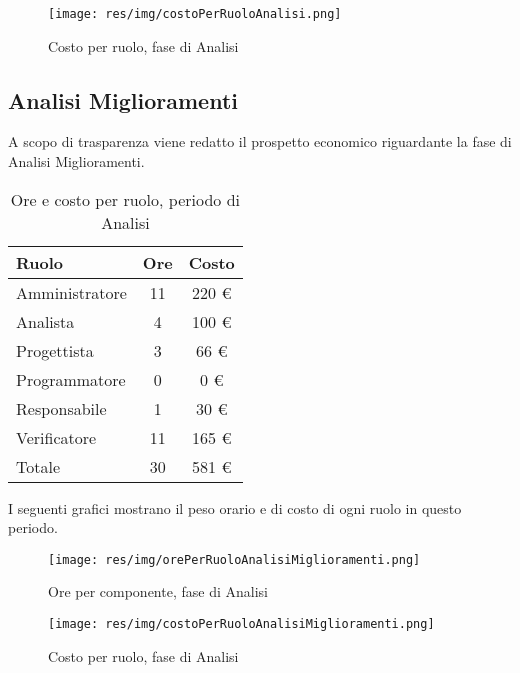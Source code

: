 \begin{figure}[H]
  \begin{center}
    \texttt{[image: res/img/costoPerRuoloAnalisi.png]}
  \caption{Costo per ruolo, fase di Analisi}
  \end{center} 
\end{figure}  


\subsection{Analisi Miglioramenti}
A scopo di trasparenza viene redatto il prospetto economico riguardante la fase di Analisi Miglioramenti.

\begin{table}[H]
	\centering
	\begin{tabular}{ l c c }
		\textbf{Ruolo} & \textbf{Ore} & \textbf{Costo} \\
		\hline
		Amministratore & 11 & 220 \euro \\
		Analista & 4 & 100 \euro \\
		Progettista & 3 & 66 \euro \\
		Programmatore & 0 & 0 \euro \\
		Responsabile & 1 & 30 \euro \\
		Verificatore & 11 & 165 \euro \\
		\hline
		Totale & 30 & 581 \euro \\
		\hline
	\end{tabular}
	\caption{Ore e costo per ruolo, periodo di Analisi}
\end{table}

I seguenti grafici mostrano il peso orario e di costo di ogni ruolo in questo periodo.

\begin{figure}[H]
  \begin{center}
    \texttt{[image: res/img/orePerRuoloAnalisiMiglioramenti.png]}
  \caption{Ore per componente, fase di Analisi}
  \end{center} 
\end{figure}  

\begin{figure}[H]
  \begin{center}
    \texttt{[image: res/img/costoPerRuoloAnalisiMiglioramenti.png]}
  \caption{Costo per ruolo, fase di Analisi}
  \end{center} 
\end{figure}  


